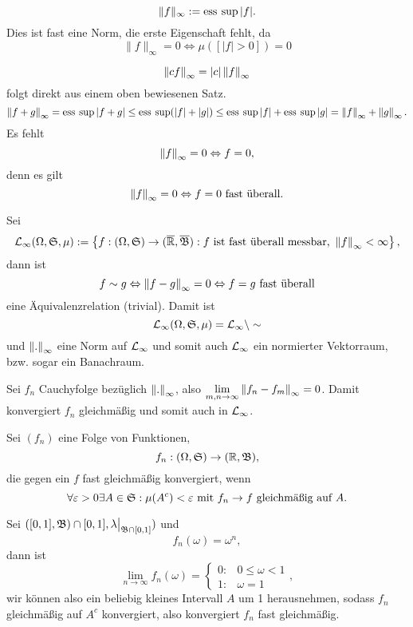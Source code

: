 			\begin{defi}
				\[ \lVert f\rVert_\infty :=\operatorname{ess\:\sup} |f|. \]
				Dies ist fast eine Norm, die erste Eigenschaft fehlt, da
				\[ \lVert f\rVert_\infty=0\Leftrightarrow \mu([|f|>0])=0 \]
			\end{defi}
			
			\begin{bew}
				\[ \left\|cf\right\|_\infty=|c|\left\|f\right\|_\infty \]
				folgt direkt aus einem oben bewiesenen Satz.
				\[ \left\|f+g\right\|_\infty=\operatorname{ess\:\sup}|f+g|\le\operatorname{ess\:\sup}(|f|+|g|)\le \operatorname{ess\:\sup}|f|+\operatorname{ess\:\sup}|g|=\left\|f\right\|_\infty+\left\|g\right\|_\infty. \]
				Es fehlt 
				\[ \left\|f\right\|_\infty=0\Leftrightarrow f=0, \]
				denn es gilt
				\[ \left\|f\right\|_\infty=0\Leftrightarrow f=0 \text{ fast überall.} \]
			\end{bew}
			
			\begin{defi}
				Sei
				\[ \mathcal{L}_\infty(\Omega,\mathfrak{S},\mu):=\left\{f:(\Omega,\mathfrak{S})\to(\overline{\mathbb{R}},\overline{\mathfrak{B}}): f\text{ ist fast überall messbar, }\left\|f\right\|_\infty<\infty\right\}, \]
				dann ist 
				\[ f\sim g\Leftrightarrow\left\|f-g\right\|_\infty=0\Leftrightarrow f=g\text{ fast überall} \]
				eine Äquivalenzrelation (trivial).  Damit ist 
				\[\mathcal{L}_\infty(\Omega,\mathfrak{S},\mu)=\mathcal{L}_\infty\setminus\sim \]
				und $\left\|.\right\|_\infty$ eine Norm auf $\mathcal{L}_\infty$ und somit auch $\mathcal{L}_\infty$ ein normierter Vektorraum, bzw. sogar ein Banachraum. 
			\end{defi}
			
			\begin{bew}
				Sei $f_n$ Cauchyfolge bezüglich $\left\|.\right\|_\infty$, also $\lim\limits_{m,n\to\infty}\left\|f_n-f_m\right\|_\infty=0$. Damit konvergiert $f_n$ gleichmäßig und somit auch in $\mathcal{L}_\infty$. 
			\end{bew}
			
			\begin{defi}
				Sei $(f_n)$ eine Folge von Funktionen,
				\[ f_n:(\Omega,\mathfrak{S})\to(\mathbb{R},\mathfrak{B}), \]
				die gegen ein $f$ fast gleichmäßig konvergiert, wenn 
				\[ \forall \varepsilon>0\exists A\in\mathfrak{S}: \mu(A^c)<\varepsilon \text{ mit } f_n\to f\text{ gleichmäßig auf }A. \]
			\end{defi}
			
			\begin{bsp}
				Sei $([0,1],\mathfrak{B})\cap[0,1],\lambda\big|_{\mathfrak{B}\cap[0,1]})$ und
				\[ f_n(\omega)=\omega^n, \]
				dann ist
				\[ \lim_{n\to\infty}f_n(\omega)=\left\{\begin{array}{ll}
				0:&0\le\omega<1\\1:&\omega=1
				\end{array}\right., \]
				wir können also ein beliebig kleines Intervall $A$ um 1 herausnehmen, sodass $f_n$ gleichmäßig auf $A^c$ konvergiert, also konvergiert $f_n$ fast gleichmäßig. 
			\end{bsp}
			

